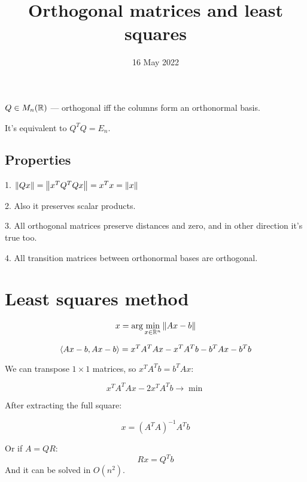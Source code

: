 
\title{Orthogonal matrices and least squares}
\author{}
\date{16 May 2022}

\maketitle

\begin{df} $Q \in M_n(\mathbb R)$ --- orthogonal iff the columns form an 
    orthonormal basis. \end{df}
It's equivalent to $Q^TQ = E_n$.

\subsection*{Properties}
1. $\norm{Qx} = \norm{x^TQ^TQx} = x^Tx = \norm{x}$

2. Also it preserves scalar products.

3. All orthogonal matrices preserve distances and zero, and in other direction it's true too.

4. All transition matrices between orthonormal bases are orthogonal.

\section*{Least squares method}

\[ x = \arg \min\limits_{x \in \mathbb R^n} \norm{Ax - b} \]

\[ \langle Ax - b, Ax - b \rangle = x^TA^TAx - x^TA^Tb  - b^TAx - b^Tb \] 

We can transpose $1\times 1$ matrices, so $x^TA^Tb = b^TAx$:

\[ x^TA^TAx - 2x^TA^Tb \to \min \]

After extracting the full square:

\[ x = (A^T A)^{-1} A^T b \] 

Or if $A = QR$:
\[ Rx = Q^T b \] 
And it can be solved in $O(n^2)$.

